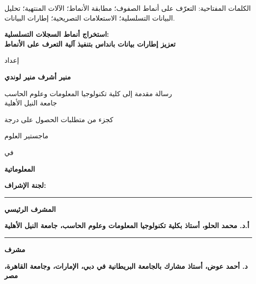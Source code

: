 \documentclass[12pt,a4paper]{article}
\newcommand{\SizeT}   {\fontsize{16pt}{26pt}\selectfont} %
\newcommand{\SizeS}   {\fontsize{14pt}{24pt}\selectfont} %
\newcommand{\LeadTitlePage}{\setstretch{1.0}}
\begin{document}
{\vspace{\baselineskip}

الكلمات المفتاحية: التعرّف على أنماط الصفوف؛ مطابقة الأنماط؛ الآلات المنتهية؛
تحليل البيانات التسلسلية؛ الاستعلامات التصريحية؛ إطارات البيانات.

}

\clearpage

\begin{center}
  \LeadTitlePage
  {\SizeT\bfseries استخراج أنماط السجلات التسلسلية:\\
   تعزيز إطارات بيانات بانداس بتنفيذ آلية التعرف على الأنماط\par}

  \vspace{10pt}
  {\SizeT إعداد\par}

  \vspace{8pt}
  {\SizeT\bfseries منير أشرف منير لوندي\par}

  \vspace{10pt}
  {\SizeS رسالة مقدمة إلى كلية تكنولوجيا المعلومات وعلوم الحاسب\\
   جامعة النيل الأهلية\par}

  \vspace{6pt}
  {\SizeS كجزء من متطلبات الحصول على درجة\par}

  \vspace{6pt}
  {\SizeS ماجستير العلوم\par}

  \vspace{6pt}
  {\SizeS في\par}

  \vspace{6pt}
  {\SizeS\bfseries المعلوماتية\par}
\end{center}

\vspace{18pt}
{\SizeS\bfseries لجنة الإشراف:\par}

\vspace{14pt}
{\SizeS
\rule{6cm}{0.4pt}\par
\textbf{المشرف الرئيسي}\par
\textbf{أ.د. محمد الحلو، أستاذ بكلية تكنولوجيا المعلومات وعلوم الحاسب،
جامعة النيل الأهلية}\par

\vspace{14pt}
\rule{6cm}{0.4pt}\par
\textbf{مشرف}\par
\textbf{د. أحمد عوض، أستاذ مشارك بالجامعة البريطانية في دبي، الإمارات،
وجامعة القاهرة، مصر}\par
}
\end{document}
